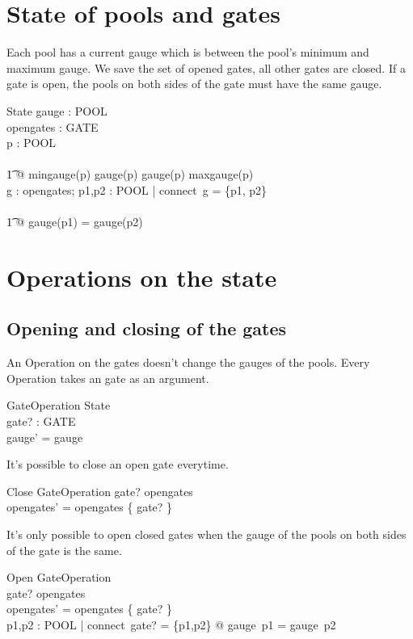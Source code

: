 \documentclass[a4paper]{article}
\begin{document}
\section{State of pools and gates}
Each pool has a current gauge which is between the pool's minimum and maximum
gauge. We save the set of opened gates, all other gates are closed. If a gate
is open, the pools on both sides of the gate must have the same gauge.

\begin{schema}{State}
  gauge : POOL \fun \nat\\
  opengates : \power GATE\\
  \where
  \forall p : POOL \\\\
  \t1 @ mingauge(p) \leq gauge(p) \land gauge(p) \leq maxgauge(p)\\
  \forall g : opengates; p1,p2 : POOL | connect~g = \{p1, p2\} \\\\
  \t1 @ gauge(p1) = gauge(p2)\\
\end{schema}

\section{Operations on the state}

\subsection{Opening and closing of the gates}
An Operation on the gates doesn't change the gauges of the pools. Every
Operation takes an gate as an argument.
\begin{schema}{GateOperation}
  \Delta State\\
  gate? : GATE\\
  \where
  gauge' = gauge
\end{schema}
It's possible to close an open gate everytime.
\begin{schema}{Close}
  GateOperation
  \where
  gate? \in opengates\\
  opengates' = opengates \setminus \{ gate? \}
\end{schema}
It's only possible to open closed gates when the gauge of the pools
on both sides of the gate is the same. 
\begin{schema}{Open}
  GateOperation\\
  \where
  gate? \notin opengates\\
  opengates' = opengates \cup \{ gate? \}\\
  \forall p1,p2 : POOL | connect~gate? = \{p1,p2\} @ gauge~p1 = gauge~p2
\end{schema}
\end{document}
